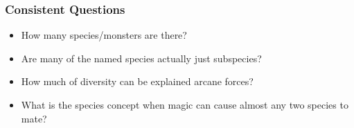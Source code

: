 \documentclass{beamer}\usepackage{graphicx, color}
\begin{document}
\begin{frame}
\end{frame}

\begin{frame}
  \frametitle{Consistent Questions}
  \Large{
  \begin{itemize}
    \item How many species/monsters are there?
    \item Are many of the named species actually just subspecies?
    \item How much of diversity can be explained arcane forces?
    \item What is the species concept when magic can cause almost any two species to mate?
  \end{itemize}
  }

\end{frame}
\end{document}
